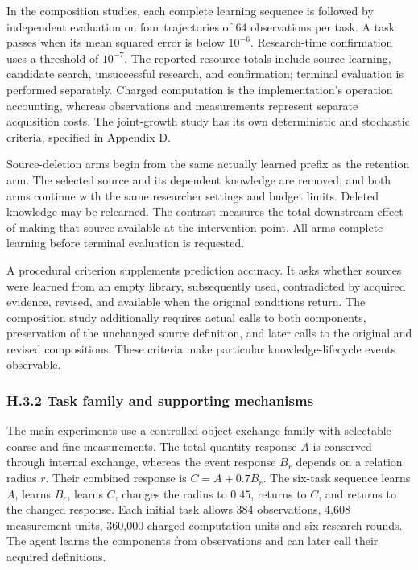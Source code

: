 \documentclass[twoside,11pt]{article}
\begin{document}
In the composition studies, each complete learning sequence is followed by independent evaluation on four trajectories of 64 observations per task. A task passes when its mean squared error is below \(10^{-6}\). Research-time confirmation uses a threshold of \(10^{-7}\). The reported resource totals include source learning, candidate search, unsuccessful research, and confirmation; terminal evaluation is performed separately. Charged computation is the implementation's operation accounting, whereas observations and measurements represent separate acquisition costs. The joint-growth study has its own deterministic and stochastic criteria, specified in Appendix D.


Source-deletion arms begin from the same actually learned prefix as the retention arm. The selected source and its dependent knowledge are removed, and both arms continue with the same researcher settings and budget limits. Deleted knowledge may be relearned. The contrast measures the total downstream effect of making that source available at the intervention point. All arms complete learning before terminal evaluation is requested.


A procedural criterion supplements prediction accuracy. It asks whether sources were learned from an empty library, subsequently used, contradicted by acquired evidence, revised, and available when the original conditions return. The composition study additionally requires actual calls to both components, preservation of the unchanged source definition, and later calls to the original and revised compositions. These criteria make particular knowledge-lifecycle events observable.


\subsubsection*{H.3.2 Task family and supporting mechanisms}

The main experiments use a controlled object-exchange family with selectable coarse and fine measurements. The total-quantity response \(A\) is conserved through internal exchange, whereas the event response \(B_r\) depends on a relation radius \(r\). Their combined response is \(C=A+0.7B_r\). The six-task sequence learns \(A\), learns \(B_r\), learns \(C\), changes the radius to \(0.45\), returns to \(C\), and returns to the changed response. Each initial task allows 384 observations, 4,608 measurement units, 360,000 charged computation units and six research rounds. The agent learns the components from observations and can later call their acquired definitions.
\end{document}
